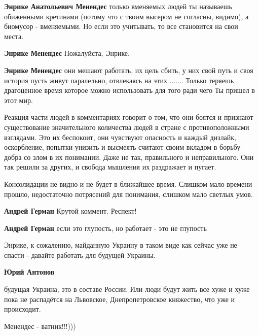 \begin{itemize}
\begin{itemize}
\textbf{Энрике Анатольевич Менендес} только вменяемых людей ты называешь обиженными кретинами (потому что с твоим высером не согласны, видимо), а биомусор - вменяемыми. Но если это учитывать, то все становится на свои места.


\textbf{Энрике Менендес} Пожалуйста, Энрике.

\textbf{Энрике Менендес} они мешают работать, их цель сбить, у них свой путь и своя история пусть живут паралельно, отвлекаясь на этих ....... Только теряешь драгоценное время которое можно использовать для того ради чего Ты пришел в этот мир.
\end{itemize} %


Реакция части людей в комментариях говорит о том, что они боятся и признают
существование значительного количества людей в стране с противоположными
взглядами. Это их беспокоит, они чувствуют опасность и каждый дизлайк,
оскорбление, попытки унизить и высмеять считают своим вкладом в борьбу добра со
злом в их понимании. Даже не так, правильного и неправильного. Они так решили
за других, и свобода мышления их раздражает и пугает.

Консолидации не видно и не будет в ближайшее время. Слишком мало времени
прошло, недостаточно потрясений для понимания, слишком мало светлых умов.

\begin{itemize} %
\textbf{Андрей Герман} Крутой коммент. Респект!

\textbf{Андрей Герман} если это глупость, но работает - это не глупость
\end{itemize} %


Энрике, к сожалению, майданную Украину в таком виде как сейчас уже не спасти -
давайте работать для будущей Украины.

\begin{itemize} %
\textbf{Юрий Антонов} 

будущая Украина, это в составе России. Или люди будут жить все хуже и хуже пока
не распадётся на Львовское, Днепропетровское
княжество, что уже и происходит.
\end{itemize} %

Менендес - ватник!!!)))


\end{itemize}
